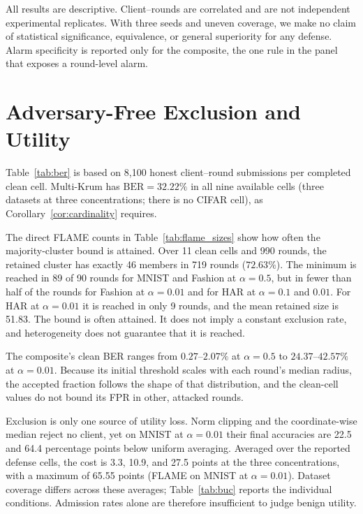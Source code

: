 \documentclass[journal]{IEEEtran}
\newcommand{\BER}{\mathrm{BER}}
\begin{document}
All results are descriptive. Client--rounds are correlated and are not independent experimental replicates. With three seeds and uneven coverage, we make no claim of statistical significance, equivalence, or general superiority for any defense. Alarm specificity is reported only for the composite, the one rule in the panel that exposes a round-level alarm.

\section{Adversary-Free Exclusion and Utility}\label{sec:benign}




Table~\ref{tab:ber} is based on 8{,}100 honest client--round submissions per completed clean cell. Multi-Krum has $\BER=32.22\%$ in all nine available cells (three datasets at three concentrations; there is no CIFAR cell), as Corollary~\ref{cor:cardinality} requires.

The direct FLAME counts in Table~\ref{tab:flame_sizes} show how often the majority-cluster bound is attained. Over 11 clean cells and 990 rounds, the retained cluster has exactly 46 members in 719 rounds ($72.63\%$). The minimum is reached in 89 of 90 rounds for MNIST and Fashion at $\alpha=0.5$, but in fewer than half of the rounds for Fashion at $\alpha=0.01$ and for HAR at $\alpha=0.1$ and $0.01$. For HAR at $\alpha=0.01$ it is reached in only 9 rounds, and the mean retained size is 51.83. The bound is often attained. It does not imply a constant exclusion rate, and heterogeneity does not guarantee that it is reached.

The composite's clean BER ranges from $0.27$--$2.07\%$ at $\alpha=0.5$ to $24.37$--$42.57\%$ at $\alpha=0.01$. Because its initial threshold scales with each round's median radius, the accepted fraction follows the shape of that distribution, and the clean-cell values do not bound its FPR in other, attacked rounds.

Exclusion is only one source of utility loss. Norm clipping and the coordinate-wise median reject no client, yet on MNIST at $\alpha=0.01$ their final accuracies are 22.5 and 64.4 percentage points below uniform averaging. Averaged over the reported defense cells, the cost is 3.3, 10.9, and 27.5 points at the three concentrations, with a maximum of 65.55 points (FLAME on MNIST at $\alpha=0.01$). Dataset coverage differs across these averages; Table~\ref{tab:buc} reports the individual conditions. Admission rates alone are therefore insufficient to judge benign utility.
\end{document}
